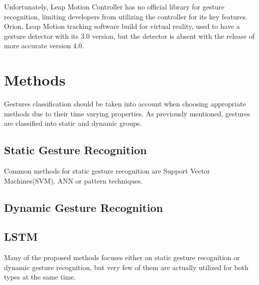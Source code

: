 Unfortunately, Leap Motion Controller has no official library for gesture recognition, limiting developers from utilizing the controller for its key features. Orion, Leap Motion tracking software build for virtual reality, used to have a gesture detector with its 3.0 version, but the detector is absent with the release of more accurate version 4.0.

\section{Methods}

Gestures classification should be taken into account when choosing appropriate methods due to their time varying properties. As previously mentioned, gestures are classified into static and dynamic groups.

\subsection{Static Gesture Recognition}

Common methods for static gesture recognition are Support Vector Machines(SVM), ANN or pattern techniques.\cite{savaris}

\subsection{Dynamic Gesture Recognition}

\subsection{LSTM}
Many of the proposed methods focuses either on static gesture recognition or dynamic gesture recognition, but very few of them are actually utilized for both types at the same time. 

